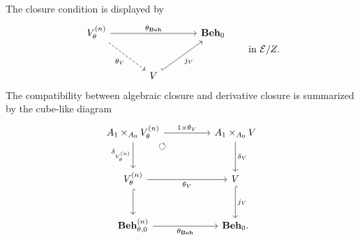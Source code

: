 The closure condition is displayed by
\[
\begin{tikzcd}[column sep=large, row sep=large]
    V^{(n)}_\theta
        \arrow[rr, "{\theta_{\mathbf{Beh}}}"]
        \arrow[dr, dashed, "\theta_V"']
    &&
    \mathbf{Beh}_0
    \\
    &
    V
        \arrow[ur, hook, "j_V"']
    &
\end{tikzcd}
\qquad
\text{in }\mathcal E/Z.
\]
The compatibility between algebraic closure and derivative closure is
summarized by the cube-like diagram
\[
\begin{tikzcd}[column sep=huge, row sep=large]
    A_1\times_{A_0}V^{(n)}_\theta
        \arrow[r, "{1\times \theta_V}"]
        \arrow[d, "\delta_{V^{(n)}_\theta}"']
        \arrow[dr, phantom, "\circlearrowleft", very near start]
    &
    A_1\times_{A_0}V
        \arrow[d, "\delta_V"]
    \\
    V^{(n)}_\theta
        \arrow[r, "\theta_V"']
        \arrow[d, hook]
    &
    V
        \arrow[d, hook, "j_V"]
    \\
    \mathbf{Beh}^{(n)}_{\theta,0}
        \arrow[r, "\theta_{\mathbf{Beh}}"']
    &
    \mathbf{Beh}_0 .
\end{tikzcd}
\]

